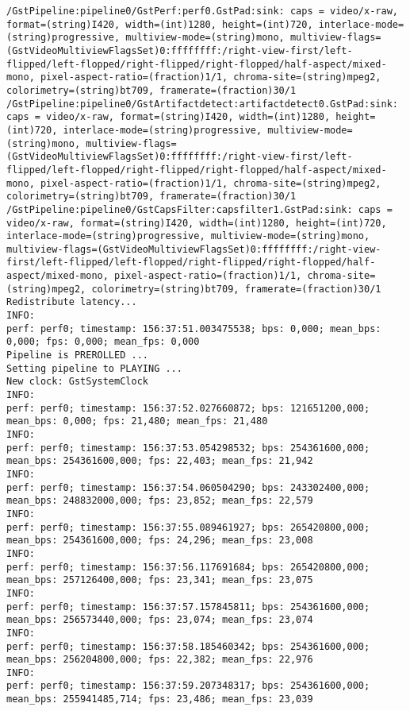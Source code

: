 \documentclass[12pt,oneside]{book}
\begin{document}
\begin{lstlisting}
/GstPipeline:pipeline0/GstPerf:perf0.GstPad:sink: caps = video/x-raw, format=(string)I420, width=(int)1280, height=(int)720, interlace-mode=(string)progressive, multiview-mode=(string)mono, multiview-flags=(GstVideoMultiviewFlagsSet)0:ffffffff:/right-view-first/left-flipped/left-flopped/right-flipped/right-flopped/half-aspect/mixed-mono, pixel-aspect-ratio=(fraction)1/1, chroma-site=(string)mpeg2, colorimetry=(string)bt709, framerate=(fraction)30/1
/GstPipeline:pipeline0/GstArtifactdetect:artifactdetect0.GstPad:sink: caps = video/x-raw, format=(string)I420, width=(int)1280, height=(int)720, interlace-mode=(string)progressive, multiview-mode=(string)mono, multiview-flags=(GstVideoMultiviewFlagsSet)0:ffffffff:/right-view-first/left-flipped/left-flopped/right-flipped/right-flopped/half-aspect/mixed-mono, pixel-aspect-ratio=(fraction)1/1, chroma-site=(string)mpeg2, colorimetry=(string)bt709, framerate=(fraction)30/1
/GstPipeline:pipeline0/GstCapsFilter:capsfilter1.GstPad:sink: caps = video/x-raw, format=(string)I420, width=(int)1280, height=(int)720, interlace-mode=(string)progressive, multiview-mode=(string)mono, multiview-flags=(GstVideoMultiviewFlagsSet)0:ffffffff:/right-view-first/left-flipped/left-flopped/right-flipped/right-flopped/half-aspect/mixed-mono, pixel-aspect-ratio=(fraction)1/1, chroma-site=(string)mpeg2, colorimetry=(string)bt709, framerate=(fraction)30/1
Redistribute latency...
INFO:
perf: perf0; timestamp: 156:37:51.003475538; bps: 0,000; mean_bps: 0,000; fps: 0,000; mean_fps: 0,000
Pipeline is PREROLLED ...
Setting pipeline to PLAYING ...
New clock: GstSystemClock
INFO:
perf: perf0; timestamp: 156:37:52.027660872; bps: 121651200,000; mean_bps: 0,000; fps: 21,480; mean_fps: 21,480
INFO:
perf: perf0; timestamp: 156:37:53.054298532; bps: 254361600,000; mean_bps: 254361600,000; fps: 22,403; mean_fps: 21,942
INFO:
perf: perf0; timestamp: 156:37:54.060504290; bps: 243302400,000; mean_bps: 248832000,000; fps: 23,852; mean_fps: 22,579
INFO:
perf: perf0; timestamp: 156:37:55.089461927; bps: 265420800,000; mean_bps: 254361600,000; fps: 24,296; mean_fps: 23,008
INFO:
perf: perf0; timestamp: 156:37:56.117691684; bps: 265420800,000; mean_bps: 257126400,000; fps: 23,341; mean_fps: 23,075
INFO:
perf: perf0; timestamp: 156:37:57.157845811; bps: 254361600,000; mean_bps: 256573440,000; fps: 23,074; mean_fps: 23,074
INFO:
perf: perf0; timestamp: 156:37:58.185460342; bps: 254361600,000; mean_bps: 256204800,000; fps: 22,382; mean_fps: 22,976
INFO:
perf: perf0; timestamp: 156:37:59.207348317; bps: 254361600,000; mean_bps: 255941485,714; fps: 23,486; mean_fps: 23,039

\end{lstlisting}
\end{document}
